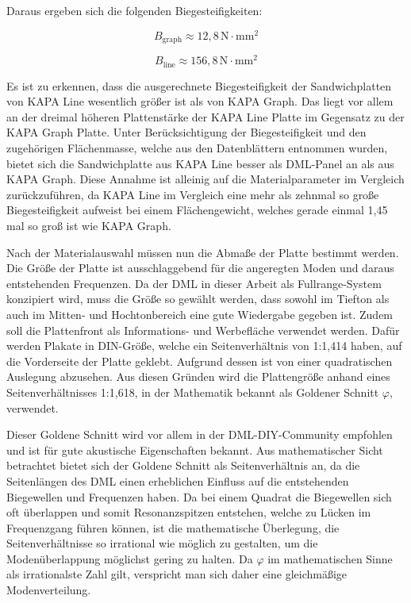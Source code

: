 Daraus ergeben sich die folgenden Biegesteifigkeiten:

\begin{equation}
B_{\text{graph}} \approx 12{,}8 \, \text{N} \cdot \text{mm}^2
\end{equation}

\begin{equation}
B_{\text{line}} \approx 156{,}8 \, \text{N} \cdot \text{mm}^2
\end{equation}

Es ist zu erkennen, dass die ausgerechnete Biegesteifigkeit der Sandwichplatten von KAPA Line wesentlich größer ist als von KAPA Graph. Das liegt vor allem an der dreimal höheren Plattenstärke der KAPA Line Platte im Gegensatz zu der KAPA Graph Platte. Unter Berücksichtigung der Biegesteifigkeit und den zugehörigen Flächenmasse, welche aus den Datenblättern entnommen wurden, bietet sich die Sandwichplatte aus KAPA Line besser als DML-Panel an als aus KAPA Graph. Diese Annahme ist alleinig auf die Materialparameter im Vergleich zurückzuführen, da KAPA Line im Vergleich eine mehr als zehnmal so große Biegesteifigkeit aufweist bei einem Flächengewicht, welches gerade einmal 1,45 mal so groß ist wie KAPA Graph.

Nach der Materialauswahl müssen nun die Abmaße der Platte bestimmt werden. Die Größe der Platte ist ausschlaggebend für die angeregten Moden und daraus entstehenden Frequenzen. Da der DML in dieser Arbeit als Fullrange-System konzipiert wird, muss die Größe so gewählt werden, dass sowohl im Tiefton als auch im Mitten- und Hochtonbereich eine gute Wiedergabe gegeben ist. Zudem soll die Plattenfront als Informations- und Werbefläche verwendet werden. 
Dafür werden Plakate in DIN-Größe, welche ein Seitenverhältnis von 1:1,414 haben, auf die Vorderseite der Platte geklebt. Aufgrund dessen ist von einer quadratischen Auslegung abzusehen. Aus diesen Gründen wird die Plattengröße anhand eines Seitenverhältnisses 1:1,618, in der Mathematik bekannt als Goldener Schnitt $\varphi$, verwendet. 

Dieser Goldene Schnitt wird vor allem in der DML-DIY-Community empfohlen und ist für gute akustische Eigenschaften bekannt. Aus mathematischer Sicht betrachtet bietet sich der Goldene Schnitt als Seitenverhältnis an, da die Seitenlängen des DML einen erheblichen Einfluss auf die entstehenden Biegewellen und Frequenzen haben. Da bei einem Quadrat die Biegewellen sich oft überlappen und somit Resonanzspitzen entstehen, welche zu Lücken im Frequenzgang führen können, ist die mathematische Überlegung, die Seitenverhältnisse so irrational wie möglich zu gestalten, um die Modenüberlappung möglichst gering zu halten. Da $\varphi$ im mathematischen Sinne als irrationalste Zahl gilt, verspricht man sich daher eine gleichmäßige Modenverteilung. 


